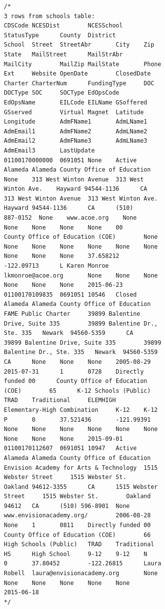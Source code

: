 \documentclass[
  letterpaper,
  DIV=11,
  numbers=noendperiod]{scrartcl}
\begin{document}
\begin{verbatim}
/*
3 rows from schools table:
CDSCode NCESDist        NCESSchool      
StatusType      County  District        
School  Street  StreetAbr       City    Zip  
State   MailStreet      MailStrAbr      
MailCity        MailZip MailState       Phone
Ext     Website OpenDate        ClosedDate   
Charter CharterNum      FundingType     DOC  
DOCType SOC     SOCType EdOpsCode       
EdOpsName       EILCode EILName GSoffered    
GSserved        Virtual Magnet  Latitude     
Longitude       AdmFName1       AdmLName1    
AdmEmail1       AdmFName2       AdmLName2    
AdmEmail2       AdmFName3       AdmLName3    
AdmEmail3       LastUpdate
01100170000000  0691051 None    Active  
Alameda Alameda County Office of Education   
None    313 West Winton Avenue  313 West 
Winton Ave.    Hayward 94544-1136      CA    
313 West Winton Avenue  313 West Winton Ave. 
Hayward 94544-1136      CA      (510) 
887-0152  None    www.acoe.org    None    
None    None    None    None    00      
County Office of Education (COE)        None 
None    None    None    None    None    None 
None    None    None    37.658212       
-122.09713      L Karen Monroe  
lkmonroe@acoe.org       None    None    None 
None    None    None    2015-06-23
01100170109835  0691051 10546   Closed  
Alameda Alameda County Office of Education   
FAME Public Charter     39899 Balentine 
Drive, Suite 335        39899 Balentine Dr., 
Ste. 335   Newark  94560-5359      CA      
39899 Balentine Drive, Suite 335        39899
Balentine Dr., Ste. 335   Newark  94560-5359 
CA      None    None    None    2005-08-29   
2015-07-31      1       0728    Directly 
funded 00      County Office of Education 
(COE)        65      K-12 Schools (Public)   
TRAD    Traditional     ELEMHIGH        
Elementary-High Combination     K-12    K-12 
P       0       37.521436       -121.99391   
None    None    None    None    None    None 
None    None    None    2015-09-01
01100170112607  0691051 10947   Active  
Alameda Alameda County Office of Education   
Envision Academy for Arts & Technology  1515 
Webster Street     1515 Webster St.        
Oakland 94612-3355      CA      1515 Webster 
Street     1515 Webster St.        Oakland 
94612   CA      (510) 596-8901  None    
www.envisionacademy.org/        2006-08-28   
None    1       0811    Directly funded 00   
County Office of Education (COE)        66   
High Schools (Public)   TRAD    Traditional  
HS      High School     9-12    9-12    N    
0       37.80452        -122.26815      Laura
Robell  laura@envisionacademy.org       None 
None    None    None    None    None    
2015-06-18
*/
\end{verbatim}
\end{document}
